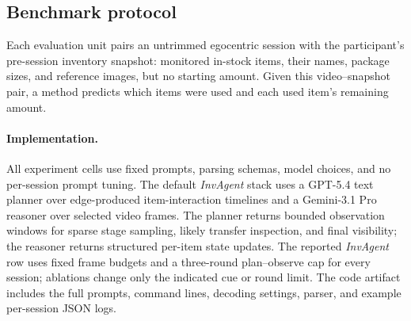 \documentclass[sigconf,anonymous,nonacm]{acmart}
\newcommand{\sys}{\textit{InvAgent}\xspace}
\begin{document}
%
%

\subsection{Benchmark protocol}

Each evaluation unit pairs an untrimmed egocentric session with the
participant's pre-session inventory snapshot: monitored in-stock items,
their names, package sizes, and reference images, but no starting
amount. Given this video--snapshot pair, a method predicts which
items were used and each used item's remaining amount. 

\paragraph{Implementation.}
All experiment cells use fixed prompts, parsing
schemas, model choices, and no per-session prompt tuning. The default
\sys stack uses a GPT-5.4 text planner over edge-produced
item-interaction timelines and a Gemini-3.1 Pro reasoner over selected
video frames. The planner returns bounded observation windows for
sparse stage sampling, likely transfer inspection, and final
visibility; the reasoner returns structured per-item state updates.
The reported \sys row uses fixed frame budgets and a three-round
plan--observe cap for every session; ablations change only the
indicated cue or round limit. The code artifact includes the full
prompts, command lines, decoding settings, parser, and
example per-session JSON logs.
\end{document}

